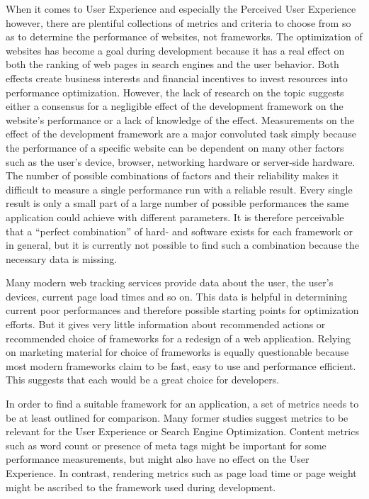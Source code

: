 \documentclass[a4paper, 10pt]{article}
\begin{document}
When it comes to User Experience and especially the Perceived User Experience however, there are plentiful collections of metrics and criteria to choose from so as to determine the performance of websites, not frameworks.
The optimization of websites has become a goal during development because it has a real effect on both the ranking of web pages in search engines and the user behavior.
Both effects create business interests and financial incentives to invest resources into performance optimization.
However, the lack of research on the topic suggests either a consensus for a negligible effect of the development framework on the website's performance or a lack of knowledge of the effect.
Measurements on the effect of the development framework are a major convoluted task simply because the performance of a specific website can be dependent on many other factors such as the user's device, browser, networking hardware or server-side hardware.
The number of possible combinations of factors and their reliability makes it difficult to measure a single performance run with a reliable result.
Every single result is only a small part of a large number of possible performances the same application could achieve with different parameters.
It is therefore perceivable that a \enquote{perfect combination} of hard- and software exists for each framework or in general, but it is currently not possible to find such a combination because the necessary data is missing.

Many modern web tracking services provide data about the user, the user's devices, current page load times and so on.
This data is helpful in determining current poor performances and therefore possible starting points for optimization efforts.
But it gives very little information about recommended actions or recommended choice of frameworks for a redesign of a web application.
Relying on marketing material for choice of frameworks is equally questionable because most modern frameworks claim to be fast, easy to use and performance efficient.
This suggests that each would be a great choice for developers.

In order to find a suitable framework for an application, a set of metrics needs to be at least outlined for comparison.
Many former studies suggest metrics to be relevant for the User Experience or Search Engine Optimization.
Content metrics such as word count or presence of meta tags might be important for some performance measurements, but might also have no effect on the User Experience.
In contrast, rendering metrics such as page load time or page weight might be ascribed to the framework used during development.
\end{document}
